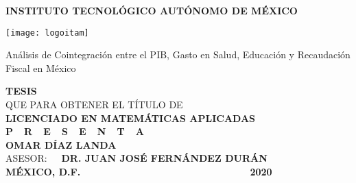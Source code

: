 \begin{titlepage}
    \begin{center}
        
        \vspace{0.2cm}

        \large
        \textbf{INSTITUTO TECNOL\'OGICO AUT\'ONOMO DE M\'EXICO}

        \vspace{1.2cm}
        
        \texttt{[image: logoitam]}
        
        \vspace{0.8cm}
        \LARGE
        Análisis de Cointegración entre el PIB, Gasto en Salud, Educación y Recaudación Fiscal en México
        
        \vspace{1.1cm}
        
        \normalsize \textbf{TESIS}\\ QUE PARA OBTENER EL T\'ITULO DE\\ \textbf{LICENCIADO EN MATEM\'ATICAS APLICADAS}\\[0.8cm]
        \normalsize \textbf{P\ \  R\ \  E\ \  S\ \  E\ \  N\ \  T\ \  A}\\[0.8cm]

        \textbf{OMAR D\'IAZ LANDA}\\[1.0cm]

        \normalsize ASESOR: \textbf{\ \ DR. JUAN JOSÉ FERN\'ANDEZ DUR\'AN}\\[1.0cm]

        \normalsize \textbf{M\'EXICO, D.F.} {\ \ \ \ \ \ \ \ \ \ \ \ \ \ \ \ \ \ \ \ \ \ \ \ \ \ \ \ \ \ \ \ \ \ } \textbf{2020}
    \end{center}
\end{titlepage}